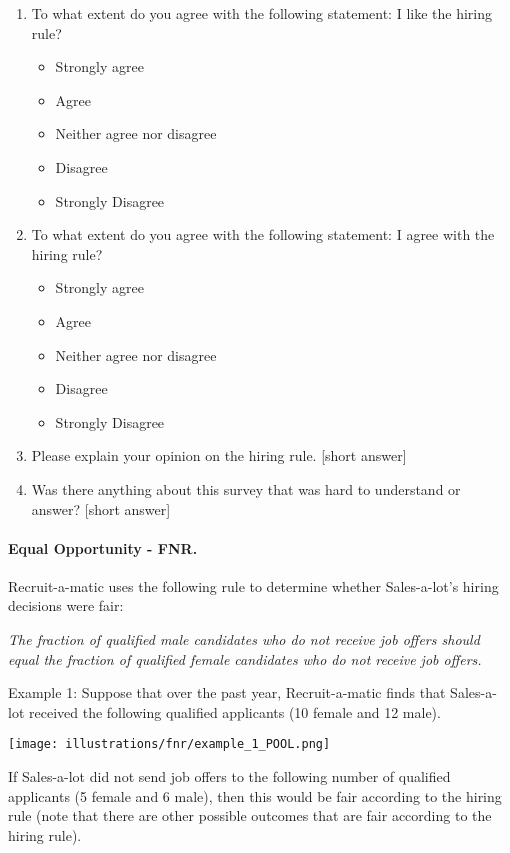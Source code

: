 \documentclass{article}
\begin{document}
\begin{enumerate}
\item To what extent do you agree with the following statement: I like the hiring rule?
\begin{itemize}
    \item Strongly agree
    \item Agree
    \item Neither agree nor disagree
    \item Disagree
    \item Strongly Disagree
\end{itemize}

\item To what extent do you agree with the following statement: I agree with the hiring rule?
\begin{itemize}
    \item Strongly agree
    \item Agree
    \item Neither agree nor disagree
    \item Disagree
    \item Strongly Disagree
\end{itemize}

\item Please explain your opinion on the hiring rule. [short answer]

\item Was there anything about this survey that was hard to understand or answer? [short answer]

\end{enumerate}

\paragraph{Equal Opportunity - FNR.}

Recruit-a-matic uses the following rule to determine whether Sales-a-lot’s hiring decisions were fair:
 
\emph{The fraction of qualified male candidates who do not receive job offers should equal the fraction of qualified female candidates who do not receive job offers.}

Example 1: Suppose that over the past year, Recruit-a-matic finds that Sales-a-lot received the following qualified applicants (10 female and 12 male).

\texttt{[image: illustrations/fnr/example\_1\_POOL.png]}

If Sales-a-lot did not send job offers to the following number of qualified applicants (5 female and 6 male), then this would be fair according to the hiring rule (note that there are other possible outcomes that are fair according to the hiring rule).
\end{document}
